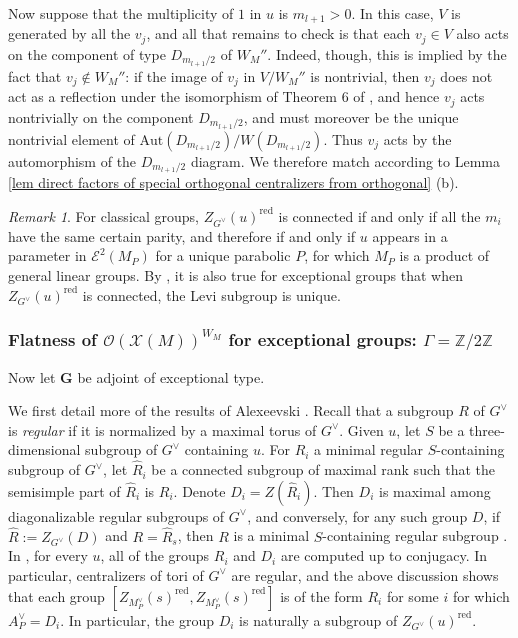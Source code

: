 \documentclass[10pt]{article}
\newcommand{\X}{\mathcal{X}}
\newcommand{\Ee}{\mathcal{E}}
\newcommand{\Z}{\mathbb{Z}}
\newcommand{\Oo}{\mathcal{O}}
\newcommand{\G}{\mathbf{G}}
\newcommand{\Aut}{\mathrm{Aut}}
\theoremstyle{definition}
\theoremstyle{remark}
\newtheorem{rem}{Remark}
\newcommand{\Zur}{Z_{G^\vee}(u)^{\mathrm{red}}}
\begin{document}
Now suppose that the multiplicity of $1$ in $u$ is $m_{l+1}>0$. In this case, $V$ is generated by all the $v_j$, and all that remains to check 
is that each $v_j\in V$ also acts on the component of type $D_{m_{l+1}/2}$ of $W_M''$. Indeed, though, 
this is implied by the fact that $v_j\not\in W_{M}''$: if the image of $v_j$ in $V/W_M''$
is nontrivial, then $v_j$ does not act as a reflection under the isomorphism of Theorem 6 of \cite{Howlett}, 
and hence $v_j$ acts nontrivially on the component $D_{m_{l+1}/2}$, and must moreover be the unique
nontrivial element of $\Aut(D_{m_{l+1}/2})/W(D_{m_{l+1}/2})$. Thus $v_j$ acts by the automorphism
of the $D_{m_{l+1}/2}$ diagram. We therefore match according to Lemma 
\ref{lem direct factors of special orthogonal centralizers from orthogonal} (b).
%
\begin{rem}
For classical groups, $\Zur$ is connected if and only if all the $m_i$ have the same certain parity,
and therefore if and only if $u$ appears in a parameter in 
$\Ee^2(M_P)$ for a unique parabolic $P$, for which $M_P$ is a product of general linear groups. 
By \cite{Ale79}, it is also true for exceptional groups that when $\Zur$ is connected, the 
Levi subgroup is unique.
\end{rem}
%
\subsubsection{Flatness of $\Oo(\X(M))^{W_M}$ for exceptional groups: $\Gamma=\Z/2\Z$}
\label{subection flatness of invariant functions on characters exceptional}
%
Now let $\G$ be adjoint of exceptional type.

We first detail more of the results of Alexeevski \cite{Ale79}.
Recall that a subgroup $R$ of $G^\vee$ is \emph{regular} if it is normalized by a maximal
torus of $G^\vee$. Given $u$, let $S$ be a 
three-dimensional subgroup of $G^\vee$ containing $u$. For $R_i$ a minimal regular $S$-containing subgroup
of $G^\vee$, let $\hat{R}_i$ be a connected subgroup of maximal rank such that the semisimple part 
of $\hat{R}_i$ is $R_i$. Denote $D_i=Z(\hat{R}_i)$. Then
$D_i$ is maximal among diagonalizable regular subgroups of $G^\vee$, and conversely, for any such group $D$,
if $\hat{R}:=Z_{G^\vee}(D)$ and $R=\hat{R}_s$, then $R$ is a minimal $S$-containing regular subgroup
\cite[Prop. 2.1]{Ale79}. 
In \cite{Ale79}, for every $u$, 
all of the groups $R_i$ and $D_i$
are computed up to conjugacy. In particular, centralizers of tori of $G^\vee$ are regular, 
and the above discussion shows that 
each group $[Z_{M_P^\vee}(s)^{\mathrm{red}},Z_{M_P^\vee}(s)^{\mathrm{red}}]$ 
is of the form $R_i$ for some $i$ for which $A_P^\vee=D_i$. In particular, the group
$D_i$ is naturally a subgroup of $\Zur$.
\end{document}
